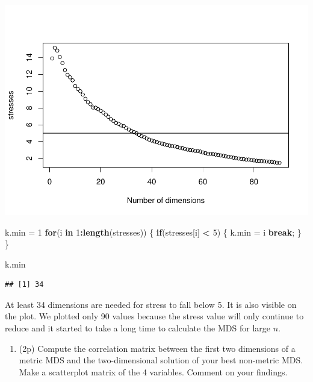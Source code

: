 \documentclass[
]{article}
\newenvironment{Shaded}{\begin{snugshade}}{\end{snugshade}}
\newcommand{\ControlFlowTok}[1]{\textcolor[rgb]{0.13,0.29,0.53}{\textbf{#1}}}
\newcommand{\DecValTok}[1]{\textcolor[rgb]{0.00,0.00,0.81}{#1}}
\newcommand{\KeywordTok}[1]{\textcolor[rgb]{0.13,0.29,0.53}{\textbf{#1}}}
\newcommand{\NormalTok}[1]{#1}
\newcommand{\OperatorTok}[1]{\textcolor[rgb]{0.81,0.36,0.00}{\textbf{#1}}}
\newcommand{\StringTok}[1]{\textcolor[rgb]{0.31,0.60,0.02}{#1}}
\providecommand{\tightlist}{%
  \setlength{\itemsep}{0pt}\setlength{\parskip}{0pt}}
\begin{document}
\includegraphics{P052020_Substructure_files/figure-latex/12th-1.pdf}

\begin{Shaded}
\begin{Highlighting}[]
\NormalTok{k.min =}\StringTok{ }\DecValTok{1}
\ControlFlowTok{for}\NormalTok{(i }\ControlFlowTok{in} \DecValTok{1}\OperatorTok{:}\KeywordTok{length}\NormalTok{(stresses)) \{}
  \ControlFlowTok{if}\NormalTok{(stresses[i] }\OperatorTok{<}\StringTok{ }\DecValTok{5}\NormalTok{) \{}
\NormalTok{    k.min =}\StringTok{ }\NormalTok{i}
    \ControlFlowTok{break}\NormalTok{;}
\NormalTok{  \}}
\NormalTok{\}}

\NormalTok{k.min}
\end{Highlighting}
\end{Shaded}

\begin{verbatim}
## [1] 34
\end{verbatim}

At least 34 dimensions are needed for stress to fall below 5. It is also
visible on the plot. We plotted only 90 values because the stress value
will only continue to reduce and it started to take a long time to
calculate the MDS for large \(n\).

\begin{enumerate}
\def\labelenumi{\arabic{enumi}.}
\setcounter{enumi}{12}
\tightlist
\item
  (2p) Compute the correlation matrix between the first two dimensions
  of a metric MDS and the two-dimensional solution of your best
  non-metric MDS. Make a scatterplot matrix of the 4 variables. Comment
  on your findings.
\end{enumerate}
\end{document}
